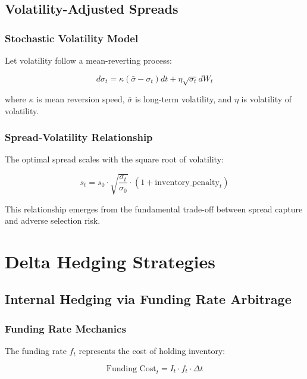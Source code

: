 \documentclass[11pt,a4paper]{article}
\theoremstyle{definition}
\begin{document}
\subsection{Volatility-Adjusted Spreads}

\subsubsection{Stochastic Volatility Model}

Let volatility follow a mean-reverting process:

\begin{equation}
d\sigma_t = \kappa (\bar{\sigma} - \sigma_t) dt + \eta \sqrt{\sigma_t} dW_t
\end{equation}

where $\kappa$ is mean reversion speed, $\bar{\sigma}$ is long-term volatility, and $\eta$ is volatility of volatility.

\subsubsection{Spread-Volatility Relationship}

The optimal spread scales with the square root of volatility:

\begin{equation}
s_t = s_0 \cdot \sqrt{\frac{\sigma_t}{\sigma_0}} \cdot \left(1 + \text{inventory\_penalty}_t\right)
\end{equation}

This relationship emerges from the fundamental trade-off between spread capture and adverse selection risk.

\section{Delta Hedging Strategies}

\subsection{Internal Hedging via Funding Rate Arbitrage}

\subsubsection{Funding Rate Mechanics}

The funding rate $f_t$ represents the cost of holding inventory:

\begin{equation}
\text{Funding Cost}_t = I_t \cdot f_t \cdot \Delta t
\end{equation}
\end{document}
